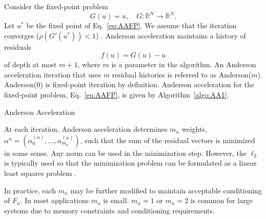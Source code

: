 Consider the fixed-point problem
\begin{equation*}
	G(u) = u, \quad G: \mathbb{R}^{N} \rightarrow \mathbb{R}^{N}.
	\label{eq:AAFP}
\end{equation*}
Let $u^{*}$ be the fixed point of Eq.~\ref{eq:AAFP}. We assume that the iteration converges ($\rho(G'(u^{*})) < 1$) \cite{ostrowski_solution_2016}. Anderson acceleration maintains a history of residuals
\begin{equation}
	f(u) = G(u) - u
\end{equation}
of depth at most $m + 1$, where $m$ is a parameter in the algorithm. An Anderson acceleration iteration that uses $m$ residual histories is referred to as Anderson($m$). Anderson(0) is fixed-point iteration by definition. Anderson acceleration for the fixed-point problem, Eq.~\ref{eq:AAFP}, is given by Algorithm~\ref{algo:AA1}. 
\begin{algorithm}[!htbp]
	\caption{Anderson Acceleration}
	\label{algo:AA1}
	\begin{algorithmic}
		\ENDFOR
	\end{algorithmic}
\end{algorithm}

At each iteration, Anderson acceleration determines $m_{n}$ weights,  $\alpha^{n} = (\alpha_{0}^{(n)}, \dots, \alpha_{m_{n}}^{(n)})$, such that the sum of the residual vectors is minimized in some sense. Any norm can be used in the minimization step. However, the $\ell_{2}$ is typically used so that the minimization problem can be formulated as a linear least squares problem \cite{walker_anderson_2011}.

In practice, each $m_{n}$ may be further modified to maintain acceptable conditioning of $F_{n}$. In most applications $m_{n}$ is small. $m_{n} = 1$ or $m_{n} = 2$ is common for large systems due to memory constraints and conditioning requirements.

